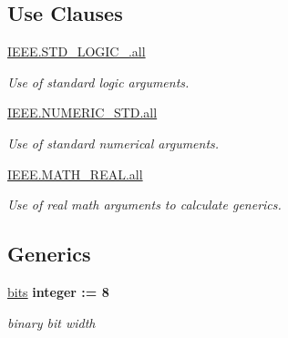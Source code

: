 \subsection*{Use Clauses}
 \begin{DoxyCompactItemize}
\item 
\hypertarget{classbin2bcd_a68c233289eaf7d2601307bdd93b4c299}{\hyperlink{classbin2bcd_a68c233289eaf7d2601307bdd93b4c299}{I\-E\-E\-E.\-S\-T\-D\-\_\-\-L\-O\-G\-I\-C\-\_.\-all}   }\label{classbin2bcd_a68c233289eaf7d2601307bdd93b4c299}

\begin{DoxyCompactList}\small\item\em Use of standard logic arguments. \end{DoxyCompactList}\item 
\hypertarget{classbin2bcd_a7c135c43c66ccd7f22abe5f6211788a5}{\hyperlink{classbin2bcd_a7c135c43c66ccd7f22abe5f6211788a5}{I\-E\-E\-E.\-N\-U\-M\-E\-R\-I\-C\-\_\-\-S\-T\-D.\-all}   }\label{classbin2bcd_a7c135c43c66ccd7f22abe5f6211788a5}

\begin{DoxyCompactList}\small\item\em Use of standard numerical arguments. \end{DoxyCompactList}\item 
\hypertarget{classbin2bcd_a8284ebf76bf629c58adbf8d637e8328b}{\hyperlink{classbin2bcd_a8284ebf76bf629c58adbf8d637e8328b}{I\-E\-E\-E.\-M\-A\-T\-H\-\_\-\-R\-E\-A\-L.\-all}   }\label{classbin2bcd_a8284ebf76bf629c58adbf8d637e8328b}

\begin{DoxyCompactList}\small\item\em Use of real math arguments to calculate generics. \end{DoxyCompactList}\end{DoxyCompactItemize}
\subsection*{Generics}
 \begin{DoxyCompactItemize}
\item 
\hypertarget{classbin2bcd_a03ce448558c2218cb8d7efccef340e15}{\hyperlink{classbin2bcd_a03ce448558c2218cb8d7efccef340e15}{bits} {\bfseries {\bfseries \textcolor{comment}{integer}\textcolor{vhdlchar}{ }\textcolor{vhdlchar}{\-:}\textcolor{vhdlchar}{=}\textcolor{vhdlchar}{ } \textcolor{vhdldigit}{8} \textcolor{vhdlchar}{ }}}}\label{classbin2bcd_a03ce448558c2218cb8d7efccef340e15}

\begin{DoxyCompactList}\small\item\em binary bit width \end{DoxyCompactList}\end{DoxyCompactItemize}
